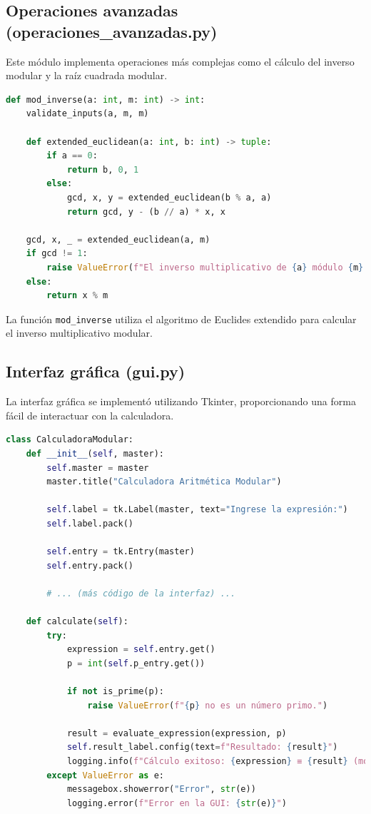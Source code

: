 \documentclass{article}
\begin{document}
\subsection{Operaciones avanzadas (operaciones\_avanzadas.py)}

Este módulo implementa operaciones más complejas como el cálculo del inverso modular y la raíz cuadrada modular.

\begin{lstlisting}[language=Python]
def mod_inverse(a: int, m: int) -> int:
    validate_inputs(a, m, m)
    
    def extended_euclidean(a: int, b: int) -> tuple:
        if a == 0:
            return b, 0, 1
        else:
            gcd, x, y = extended_euclidean(b % a, a)
            return gcd, y - (b // a) * x, x

    gcd, x, _ = extended_euclidean(a, m)
    if gcd != 1:
        raise ValueError(f"El inverso multiplicativo de {a} módulo {m} no existe.")
    else:
        return x % m
\end{lstlisting}

La función \texttt{mod\_inverse} utiliza el algoritmo de Euclides extendido para calcular el inverso multiplicativo modular.

\subsection{Interfaz gráfica (gui.py)}

La interfaz gráfica se implementó utilizando Tkinter, proporcionando una forma fácil de interactuar con la calculadora.

\begin{lstlisting}[language=Python]
class CalculadoraModular:
    def __init__(self, master):
        self.master = master
        master.title("Calculadora Aritmética Modular")

        self.label = tk.Label(master, text="Ingrese la expresión:")
        self.label.pack()

        self.entry = tk.Entry(master)
        self.entry.pack()

        # ... (más código de la interfaz) ...

    def calculate(self):
        try:
            expression = self.entry.get()
            p = int(self.p_entry.get())
            
            if not is_prime(p):
                raise ValueError(f"{p} no es un número primo.")
            
            result = evaluate_expression(expression, p)
            self.result_label.config(text=f"Resultado: {result}")
            logging.info(f"Cálculo exitoso: {expression} ≡ {result} (mod {p})")
        except ValueError as e:
            messagebox.showerror("Error", str(e))
            logging.error(f"Error en la GUI: {str(e)}")
\end{lstlisting}
\end{document}
